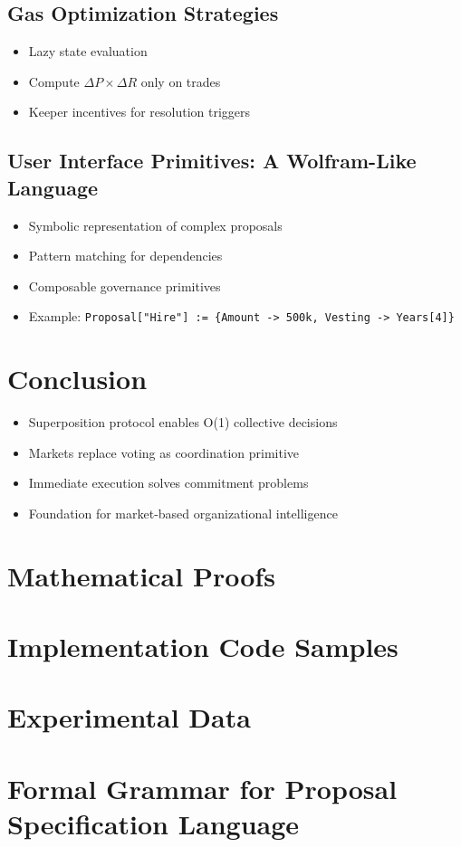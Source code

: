 \documentclass{article}
\begin{document}
\subsection{Gas Optimization Strategies}
\begin{itemize}
    \item Lazy state evaluation
    \item Compute $\Delta P \times \Delta R$ only on trades
    \item Keeper incentives for resolution triggers
\end{itemize}

\subsection{User Interface Primitives: A Wolfram-Like Language}
\begin{itemize}
    \item Symbolic representation of complex proposals
    \item Pattern matching for dependencies
    \item Composable governance primitives
    \item Example: \texttt{Proposal["Hire"] := \{Amount -> 500k, Vesting -> Years[4]\}}
\end{itemize}

\section{Conclusion}
\begin{itemize}
   \item Superposition protocol enables O(1) collective decisions
   \item Markets replace voting as coordination primitive
   \item Immediate execution solves commitment problems
   \item Foundation for market-based organizational intelligence
\end{itemize}


\appendix
\section{Mathematical Proofs}
\section{Implementation Code Samples}
\section{Experimental Data}
\section{Formal Grammar for Proposal Specification Language}



\end{document}
